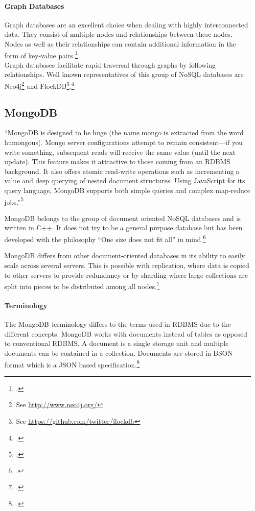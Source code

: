 \paragraph{Graph Databases}
\label{sec:nosql-graph}
Graph databases are an excellent choice when dealing with highly interconnected
data. They consist of multiple nodes and relationships between these nodes.
Nodes as well as their relationships can contain additional information in the
form of key-value pairs.\footcite[Cf.][6]{Redmond_2012}\\
Graph databases facilitate rapid traversal through graphs by following
relationships. Well known representatives of this group of NoSQL databases are
Neo4j\footnote{See \url{http://www.neo4j.org/}} and FlockDB\footnote{See
\url{https://github.com/twitter/flockdb}}.\footcite[Cf.][19]{Tiwari_2011}


\subsection{MongoDB}
\label{sec:mongodb}


``MongoDB is designed to be huge (the name mongo is extracted from the word
humongous). Mongo server configurations attempt to remain consistent—if
you write something, subsequent reads will receive the same value (until the
next update). This feature makes it attractive to those coming from an RDBMS
background. It also offers atomic read-write operations such as incrementing
a value and deep querying of nested document structures. Using JavaScript
for its query language, MongoDB supports both simple queries and complex
map-reduce jobs.''\footcite[][6]{Redmond_2012}

MongoDB belongs to the group of document oriented NoSQL databases and is written
in C++. It does not try to be a general purpose database but has been developed
with the philosophy ``One size does not fit all'' in mind.\footcite[Cf.][3]{Plugge_2010}

MongoDB differs from other document-oriented databases in its ability to easily
scale across several servers. This is possible with replication, where data is 
copied to other servers to provide redundancy or by sharding where large
collections are split into pieces to be distributed among all
nodes.\footcite[Cf.][165]{Redmond_2012}

\paragraph{Terminology}
The MongoDB terminology differs to the terms used in RDBMS due to the different
concepts. MongoDB works with documents instead of tables as opposed to conventional RDBMS.
A document is a single storage unit and multiple documents can be contained in a
collection. Documents are stored in BSON format which is a JSON based
specification.\footcite[Cf.][]{bson_spec}

